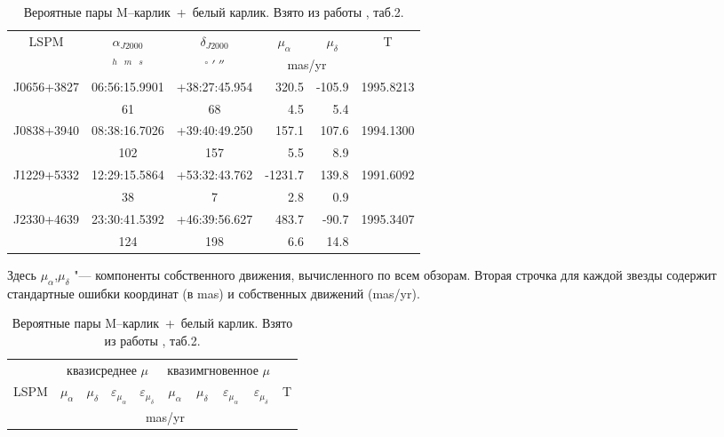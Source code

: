 \begin{table}[t]
\vspace{6mm}
\centering
\caption{Вероятные пары \glqq M--карлик~+~белый карлик\grqq . Взято из работы \cite{2015AstL...41..833K}, таб.2.}
\label{tab:MDWD}
\vspace{5mm}

\begin{tabularx}{\textwidth}{c|c|c|r|r|c} 
\hline
\multirow{2}{*}{LSPM} & $\alpha_{J2000}$ & $\delta_{J2000}$ &\multicolumn{1}{c|}{$\mu_\alpha$}&\multicolumn{1}{c|}{$\mu_\delta$}& \multirow{2}{*}{T} \\ \cline{2-5}
& $^h$~$^m$~$^s$  & $^\circ~'~''$ & \multicolumn{2}{c|}{mas/yr} & \\ \hline
J0656+3827 & 06:56:15.9901 & +38:27:45.954 &   320.5 & -105.9 & 1995.8213 \\
           & 61            & 68            &     4.5 &    5.4 & \\
J0838+3940 & 08:38:16.7026 & +39:40:49.250 &   157.1 &  107.6 & 1994.1300 \\
           & 102           & 157           &     5.5 &    8.9 & \\
J1229+5332 & 12:29:15.5864 & +53:32:43.762 & -1231.7 &  139.8 & 1991.6092 \\
           & 38            & 7             &     2.8 &    0.9 & \\
J2330+4639 & 23:30:41.5392 & +46:39:56.627 &   483.7 &  -90.7 & 1995.3407 \\
           & 124           & 198           &     6.6 &   14.8 & \\ \hline
\end{tabularx}
\begin{flushleft}
\footnotesize     
Здесь $\mu_\alpha$,$\mu_\delta$ "--- компоненты собственного движения, вычисленного по всем обзорам. Вторая строчка для каждой звезды содержит стандартные ошибки координат (в mas) и собственных движений (mas/yr).
\end{flushleft}
\begin{tabularx}{\textwidth}{l|r|r|r|r|r|r|r|r|c} \hline
     & \multicolumn{4}{c|}{квазисреднее $\mu$ }
     &\multicolumn{4}{c|}{квазимгновенное $\mu$}&  \\ \cline{2-9}
\multicolumn{1}{c|}{LSPM}&\multicolumn{1}{c|}{$\mu_\alpha$}&\multicolumn{1}{c|}{$\mu_\delta$}&\multicolumn{1}{c|}{$\varepsilon_{\mu_\alpha}$}&\multicolumn{1}{c|}{$\varepsilon_{\mu_\delta}$}
	 &\multicolumn{1}{c|}{$\mu_\alpha$}&\multicolumn{1}{c|}{$\mu_\delta$}&\multicolumn{1}{c|}{$\varepsilon_{\mu_\alpha}$}&\multicolumn{1}{c|}{$\varepsilon_{\mu_\delta}$}
	 &   T\\ \cline{2-9} 
     &\multicolumn{8}{c|}{mas/yr}&\\ \hline


\end{tabularx}
\end{table}
